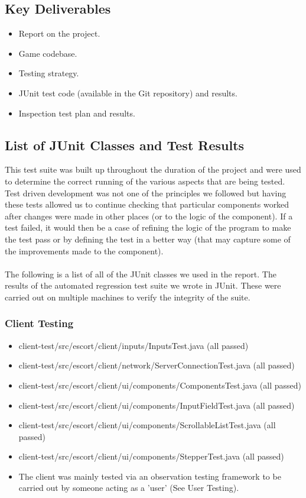 \documentclass[12pt]{article}
\newcommand{\return}{\\\\\noindent}
\begin{document}
\subsection{Key Deliverables}
\begin{itemize}
\item Report on the project.
\item Game codebase.
\item Testing strategy.
\item JUnit test code (available in the Git repository) and results.
\item Inspection test plan and results.
\end{itemize}
\subsection{List of JUnit Classes and Test Results}
This test suite was built up throughout the duration of the project and were used to determine the correct running of the various aspects that are being tested. Test driven development was not one of the principles we followed but having these tests allowed us to continue checking that particular components worked after changes were made in other places (or to the logic of the component). If a test failed, it would then be a case of refining the logic of the program to make the test pass or by defining the test in a better way (that may capture some of the improvements made to the component).\return
The following is a list of all of the JUnit classes we used in the report. The results of the automated regression test suite we wrote in JUnit. These were carried  out on multiple machines to verify the integrity of the suite.
\subsubsection{Client Testing}
\begin{itemize}
\item client-test/src/escort/client/inputs/InputsTest.java (all passed)
\item client-test/src/escort/client/network/ServerConnectionTest.java (all passed)
\item client-test/src/escort/client/ui/components/ComponentsTest.java (all passed)
\item client-test/src/escort/client/ui/components/InputFieldTest.java (all passed)
\item client-test/src/escort/client/ui/components/ScrollableListTest.java (all passed)
\item client-test/src/escort/client/ui/components/StepperTest.java (all passed)
\item The client was mainly tested via an observation testing framework to be carried out by someone acting as a 'user' (See User Testing).
\end{itemize}
\end{document}

